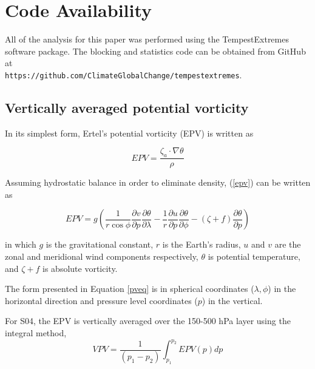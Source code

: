 \documentclass[smallextended]{svjour3}       %
\numberwithin{equation}{section}
\begin{document}
\section{Code Availability}
All of the analysis for this paper was performed using the TempestExtremes software package. The blocking and statistics code can be obtained from GitHub at\\ \texttt{https://github.com/ClimateGlobalChange/tempestextremes}.



\begin{appendices}

\section{Vertically averaged potential vorticity}\label{vpveq}

In its simplest form, Ertel's potential vorticity (EPV) is written as

\begin{equation}
EPV = \frac{\zeta_a\cdot \nabla \theta}{\rho}\label{epv}
\end{equation}

\noindent
Assuming hydrostatic balance in order to eliminate density, (\ref{epv}) can be written as 

\begin{equation}
  EPV=g\left(\frac{1}{r\cos\phi}\frac{\partial v}{\partial p}\frac{\partial \theta}{\partial \lambda}-\frac{1}{r}\frac{\partial u}{\partial p}\frac{\partial \theta}{\partial \phi}-(\zeta+f)\frac{\partial \theta}{\partial p}\right)\label{pveq}
\end{equation}

\noindent
in which $g$ is the gravitational constant, $r$ is the Earth's radius, $u$ and $v$ are the zonal and meridional wind components respectively, $\theta$ is potential temperature, and $\zeta + f$ is absolute vorticity.


The form presented in Equation \ref{pveq} is in spherical coordinates ($\lambda, \phi$) in the horizontal direction and pressure level coordinates ($p$) in the vertical. 


For S04, the EPV is vertically averaged over the 150-500 hPa layer using the integral method, 
\begin{equation}VPV=\frac{1}{(p_1-p_2)}\int_{p_1}^{p_2} EPV(p) dp\end{equation}


\end{appendices}
\end{document}
